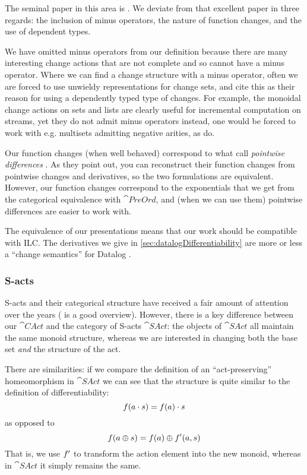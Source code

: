 The seminal paper in this area is \textcite{cai2014changes}. We deviate from
that excellent paper in three regards: the
inclusion of minus operators, the nature of function changes, and the use of
dependent types.

We have omitted minus operators from our definition because
there are many interesting change actions that are not complete and so cannot
have a minus operator. Where we can find a change structure with a minus operator, often we are
forced to use unwieldy representations for change sets, and
\citeauthor{cai2014changes} cite this as their reason for using a dependently
typed type of changes. For example, the monoidal change actions on sets and lists are clearly
useful for incremental computation on streams, yet they do not admit minus
operators \textemdash{} instead, one would
be forced to work with e.g. multisets admitting negative arities, as \citeauthor{cai2014changes} do.

Our function changes (when well behaved) correspond to what \citeauthor{cai2014changes} call
\emph{pointwise differences} \autocite[see][section 2.2]{cai2014changes}. As
they point out, you can reconstruct their
function changes from pointwise changes and derivatives, so the two formulations
are equivalent. However, our function changes correspond to the
exponentials that we get from the categorical equivalence with $\cat{PreOrd}$,
and (when we can use them) pointwise differences are easier to work with.

The equivalence of our presentations means that our work should be compatible
with ILC. The derivatives we give in \cref{sec:datalogDifferentiability} are more or
less a ``change semantics'' for Datalog \autocite[see][section
3.5]{cai2014changes}. 

\subsubsection{S-acts}
\label{sec:sacts}

S-acts and their categorical structure have received a fair amount of attention
over the years (\textcite{kilp2000monoids} is a good
overview). However, there is a key difference between our $\cat{CAct}$ and the category of
S-acts $\cat{SAct}$: the objects of $\cat{SAct}$ all maintain the same monoid
structure, whereas we are interested in changing both the base set \emph{and} the structure of the act.

There are similarities: if we compare the definition of an ``act-preserving''
homeomorphism in $\cat{SAct}$ \autocite[see][]{kilp2000monoids} we can see that the structure is
quite similar to the definition of differentiability:
\begin{displaymath}
  f(a \cdot s) = f(a) \cdot s
\end{displaymath}
as opposed to
\begin{displaymath}
  f(a \oplus s) = f(a) \oplus f'(a, s)
\end{displaymath}
That is, we use $f'$ to transform the action element into the new
monoid, whereas in $\cat{SAct}$ it simply remains the same.

